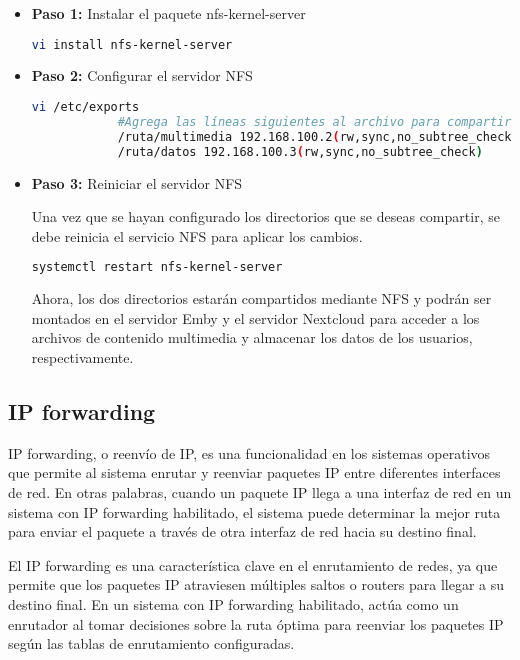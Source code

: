 		
		\begin{itemize}
			\item \textbf{Paso 1:} Instalar el paquete nfs-kernel-server
			\begin{lstlisting}[language=Bash, caption=nfs]
		vi install nfs-kernel-server
			\end{lstlisting}
		
			\item\textbf{Paso 2:} Configurar el servidor NFS
			\begin{lstlisting}[language=Bash, caption=export]
			vi /etc/exports
			#Agrega las líneas siguientes al archivo para compartir los dos directorios:
			/ruta/multimedia 192.168.100.2(rw,sync,no_subtree_check)
			/ruta/datos 192.168.100.3(rw,sync,no_subtree_check)
			\end{lstlisting}
				
			\item\textbf{Paso 3:} Reiniciar el servidor NFS\par
			Una vez que se hayan configurado los directorios que se deseas compartir, se debe reinicia el servicio NFS para aplicar los cambios.
			\begin{lstlisting}[language=Bash, caption=export]
			systemctl restart nfs-kernel-server
			\end{lstlisting}
				
			Ahora, los dos directorios estarán compartidos mediante NFS y podrán ser montados en el servidor Emby y el servidor Nextcloud para acceder a los archivos de contenido multimedia y almacenar los datos de los usuarios, respectivamente. 
		\end{itemize}
		
		\subsection{IP forwarding}
		
		IP forwarding, o reenvío de IP, es una funcionalidad en los sistemas operativos que permite al sistema enrutar y reenviar paquetes IP entre diferentes interfaces de red. En otras palabras, cuando un paquete IP llega a una interfaz de red en un sistema con IP forwarding habilitado, el sistema puede determinar la mejor ruta para enviar el paquete a través de otra interfaz de red hacia su destino final.\par
		
		El IP forwarding es una característica clave en el enrutamiento de redes, ya que permite que los paquetes IP atraviesen múltiples saltos o routers para llegar a su destino final. En un sistema con IP forwarding habilitado, actúa como un enrutador al tomar decisiones sobre la ruta óptima para reenviar los paquetes IP según las tablas de enrutamiento configuradas.\par
		
